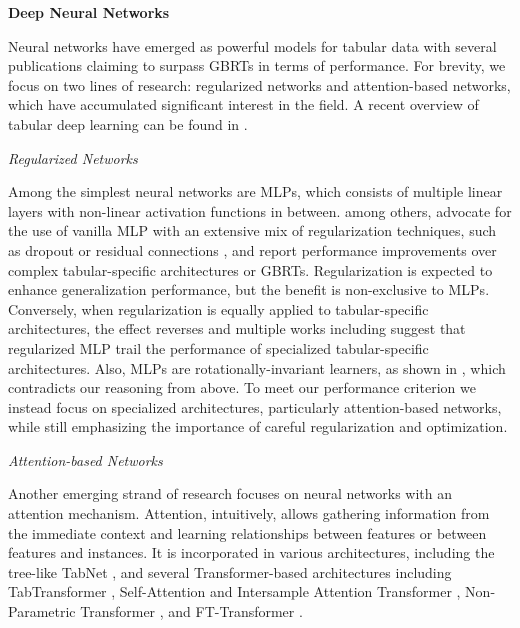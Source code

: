 \textbf{Deep Neural Networks}

Neural networks have emerged as powerful models for tabular data with several publications claiming to surpass \glspl{GBRT} in terms of performance. For brevity, we focus on two lines of research: regularized networks and attention-based networks, which have accumulated significant interest in the field. A recent overview of tabular deep learning can be found in \textcite[][1--21]{borisovDeepNeuralNetworks2022}.

\emph{Regularized Networks}

Among the simplest neural networks are \glspl{MLP}, which consists of multiple linear layers with non-linear activation functions in between. \textcite[][23936--23937]{kadraWelltunedSimpleNets2021} among others, advocate for the use of vanilla \gls{MLP} with an extensive mix of regularization techniques, such as dropout \autocite[][1930]{srivastavaDropoutSimpleWay} or residual connections \autocite[][2]{heDeepResidualLearning2015}, and report performance improvements over complex tabular-specific architectures or \glspl{GBRT}. Regularization is expected to enhance generalization performance, but the benefit is non-exclusive to \glspl{MLP}. Conversely, when regularization is equally applied to tabular-specific architectures, the effect reverses and multiple works including \textcites[][18938]{gorishniyRevisitingDeepLearning2021}[][511]{grinsztajnWhyTreebasedModels2022} suggest that regularized \gls{MLP} trail the performance of specialized tabular-specific architectures. Also, \glspl{MLP} are rotationally-invariant learners, as shown in \textcite[][511]{grinsztajnWhyTreebasedModels2022}, which contradicts our reasoning from above. To meet our performance criterion we instead focus on specialized architectures, particularly attention-based networks, while still emphasizing the importance of careful regularization and optimization.

\emph{Attention-based Networks}

Another emerging strand of research focuses on neural networks with an attention mechanism. Attention, intuitively, allows gathering information from the immediate context and learning relationships between features or between features and instances. It is incorporated in various architectures, including the tree-like TabNet \autocite[][3--5]{arikTabnetAttentiveInterpretable2020}, and several Transformer-based architectures including TabTransformer \autocite[][2--3]{huangTabTransformerTabularData2020}, Self-Attention and Intersample Attention Transformer \autocite[][4--5]{somepalliSaintImprovedNeural2021}, Non-Parametric Transformer \autocite[][28745--28746]{kossenSelfAttentionDatapointsGoing2021}, and FT-Transformer \autocite[][18935--18936]{gorishniyRevisitingDeepLearning2021}.

